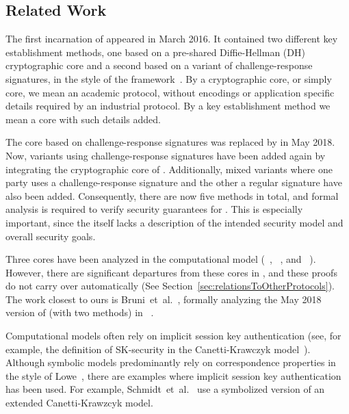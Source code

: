 \documentclass[runningheads, envcountsame, a4paper, draft, x11names]{llncs}
\begin{document}
\subsection{Related Work}
\label{sec:relatedWork}
%
The first incarnation of \mEdhoc{} appeared in March 2016.
%
It contained two different key establishment methods, one based on a
pre-shared Diffie-Hellman (DH) cryptographic core and a second based on a
variant of challenge-response signatures, in the style of the \mNoise{}
framework~\cite{perrin2016noise}.
%
By a cryptographic core, or simply core, we mean an academic protocol, without
encodings or application specific details required by an industrial protocol.
%
By a key establishment method we mean a core with such details added.
%

The core based on challenge-response signatures was replaced by \mSigma{}
in May 2018.
%
Now, variants using challenge-response signatures have been added again by
integrating the cryptographic core of \mOptls{}.
%
Additionally, mixed variants where one party uses a challenge-response
signature and the other a regular signature have also been added.
%
Consequently, there are now five methods in total, and formal analysis is
required to verify security guarantees for \mEdhoc.
%
This is especially important, since the \mSpec{} itself lacks a description
of the intended security model and overall security goals.
%

Three cores have been analyzed in the computational model (\mSigma{}~\cite{DBLP:conf/crypto/CanettiK02},
\mOptls{}~\cite{DBLP:conf/eurosp/KrawczykW16}, and
\mNoise{}~\cite{DBLP:conf/eurosp/KobeissiNB19}).
%
However, there are significant departures from these cores in \mEdhoc, and
these proofs do not carry over automatically
(See Section~\ref{sec:relationsToOtherProtocols}).
%
The work closest to ours is Bruni~et~al.~\cite{DBLP:conf/secsr/BruniJPS18},
formally analyzing the May 2018 version of \mEdhoc{} (with two methods) in
\mProverif~\cite{DBLP:conf/csfw/Blanchet01}.
%


Computational models often rely on implicit session key authentication
(see, for example, the definition of SK-security in the Canetti-Krawczyk
model~\cite{DBLP:conf/crypto/CanettiK02}).
%
Although symbolic models predominantly rely on correspondence properties
in the style of Lowe~\cite{DBLP:conf/csfw/Lowe97a}, there are examples where
implicit session key authentication has been used.
%
For example, Schmidt~et~al.~\cite{DBLP:conf/csfw/SchmidtMCB12} use a
symbolized version of an extended Canetti-Krawzcyk model.
%
\end{document}
